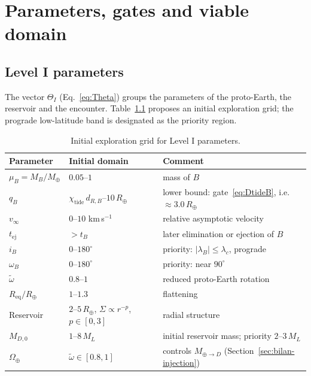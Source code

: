 \documentclass[11pt,a4paper,openany]{report}
\newcommand{\Mt}{M_{\oplus}}
\newcommand{\Rt}{R_{\oplus}}
\newcommand{\Req}{R_{\mathrm{eq}}}
\begin{document}
\chapter{Parameters, gates and viable domain}
\label{ch:portes}

\section{Level I parameters}

The vector $\Theta_I$ (Eq.~\eqref{eq:Theta}) groups the parameters of the proto-Earth, the
reservoir and the encounter. Table~\ref{tab:grille} proposes an initial exploration grid; the
prograde low-latitude band is designated as the priority region.

\begin{table}[htbp]
\centering
\small
\caption{Initial exploration grid for Level I parameters.}
\label{tab:grille}
\begin{tabular}{lll}
\toprule
\textbf{Parameter} & \textbf{Initial domain} & \textbf{Comment} \\
\midrule
$\mu_B=M_B/\Mt$ & $0.05$--$1$ & mass of $B$ \\
$q_B$ & $\chi_{\mathrm{tide}}\,d_{R,B}$--$10\,\Rt$ & lower bound: gate~\eqref{eq:DtideB}, i.e. $\approx3.0\,\Rt$ \\
$v_\infty$ & $0$--$10$ km\,s$^{-1}$ & relative asymptotic velocity \\
$t_{\mathrm{ej}}$ & $>t_B$ & later elimination or ejection of $B$ \\
$i_B$ & $0$--$180^\circ$ & priority: $|\lambda_B|\le\lambda_c$, prograde \\
$\omega_B$ & $0$--$180^\circ$ & priority: near $90^\circ$ \\
$\tilde\omega$ & $0.8$--$1$ & reduced proto-Earth rotation \\
$\Req/\Rt$ & $1$--$1.3$ & flattening \\
Reservoir & $2$--$5\,\Rt$, $\Sigma\propto r^{-p}$, $p\in[0,3]$ & radial structure \\
$M_{D,0}$ & $1$--$8\,M_L$ & initial reservoir mass; priority $2$--$3\,M_L$ \\
$\Omega_\oplus$ & $\tilde\omega\in[0.8,1]$ & controls $M_{\oplus\to D}$ (Section~\ref{sec:bilan-injection}) \\
\bottomrule
\end{tabular}
\end{table}
\end{document}
